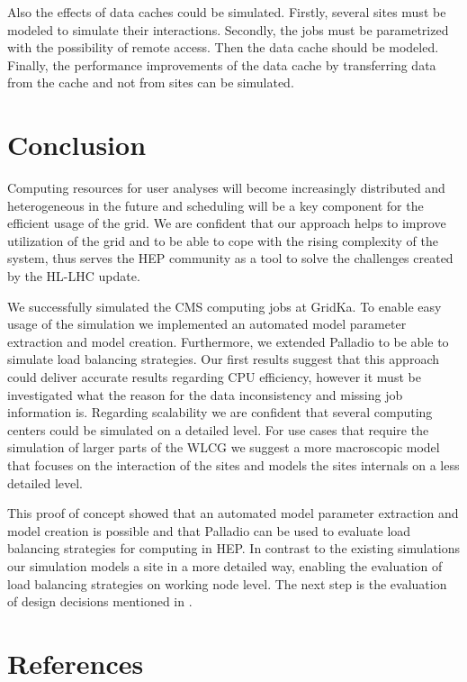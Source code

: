 \documentclass[a4paper]{jpconf}
\begin{document}
Also the effects of data caches could be simulated. Firstly, several sites must be modeled to simulate their interactions. Secondly, the jobs must be parametrized with the possibility of remote access. Then the data cache should be modeled. Finally, the performance improvements of the data cache by transferring data from the cache and not from sites can be simulated.
\section{Conclusion}
\label{conlusion}

Computing resources for user analyses will become increasingly distributed and heterogeneous in the future and 
scheduling will be a key component for the efficient usage of the grid. We are confident that our approach helps to improve utilization of the grid and to be able to cope with the rising complexity of the system, thus serves the HEP community as a tool to solve the challenges created by the HL-LHC update.

We successfully simulated the CMS computing jobs at GridKa. To enable easy usage of the simulation we implemented an automated model parameter extraction and model creation. Furthermore, we extended Palladio to be able to simulate load balancing strategies. Our first results suggest that this approach could deliver accurate results regarding CPU efficiency, however it must be investigated what the reason for the data inconsistency and missing job information is. Regarding scalability we are confident that several computing centers could be simulated on a detailed level. For use cases that require the simulation of larger parts of the WLCG we suggest a more macroscopic model that focuses on the interaction of the sites and models the sites internals on a less detailed level.

This proof of concept showed that an automated model parameter extraction and model creation is possible and that Palladio can be used to evaluate load balancing strategies for computing in HEP. In contrast to the existing simulations our simulation models a site in a more detailed way, enabling the evaluation of load balancing strategies on working node level. The next step is the evaluation of design decisions mentioned in .
\section*{References}

\end{document}
